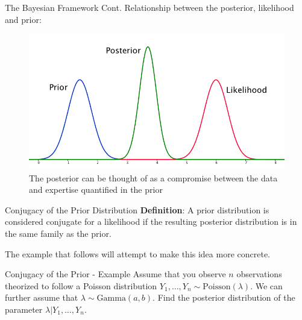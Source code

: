 \documentclass{beamer}
\begin{document}
\begin{frame}{The Bayesian Framework Cont.}
Relationship between the posterior, likelihood and prior:
\begin{center}
\begin{figure}
    \centering
    \includegraphics[scale = 0.4]{posteriorplot.png}
    \caption{The posterior can be thought of as a compromise between the data and expertise quantified in the prior}
    \label{fig:my_label}
\end{figure}
\end{center}
\end{frame}

\begin{frame}{Conjugacy of the Prior Distribution}
\textbf{Definition}:
A prior distribution is considered conjugate for a likelihood if the resulting posterior distribution is in the same family as the prior. 
\newline


The example that follows will attempt to make this idea more concrete. 
\end{frame}

\begin{frame}{Conjugacy of the Prior - Example}
Assume that you observe $n$ observations theorized to follow a Poisson distribution $Y_{1},\ldots, Y_{n} \sim \mathrm{Poisson}(\lambda)$. We can further assume that $\lambda \sim \mathrm{Gamma}(a, b)$. Find the posterior distribution of the parameter $\lambda|Y_{1},\ldots, Y_{n}$. 
\end{frame}
\end{document}

